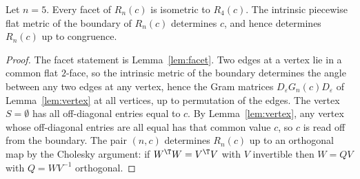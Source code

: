 \begin{theorem}\label{thm:main}
Let $n=5$. Every facet of $R_n(c)$ is isometric to $R_{4}(c)$.
The intrinsic piecewise flat metric of the boundary of $R_n(c)$ determines $c$, and hence determines $R_n(c)$ up to congruence.
\end{theorem}
\begin{proof}
The facet statement is Lemma~\ref{lem:facet}.
Two edges at a vertex lie in a common flat $2$-face, so the intrinsic metric of the boundary determines the angle between any two edges at any vertex, hence the Gram matrices $D_\varepsilon G_n(c)D_\varepsilon$ of Lemma~\ref{lem:vertex} at all vertices, up to permutation of the edges. The vertex $S=\emptyset$ has all off-diagonal entries equal to $c$. By Lemma~\ref{lem:vertex}, any vertex whose off-diagonal entries are all equal has that common value $c$, so $c$ is read off from the boundary. The pair $(n,c)$ determines $R_n(c)$ up to an orthogonal map by the Cholesky argument: if $W^\T W=V^\T V$ with $V$ invertible then $W=QV$ with $Q=WV^{-1}$ orthogonal.
\end{proof}
